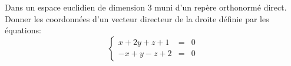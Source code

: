 Dans un espace euclidien de dimension 3 muni d'un rep\`ere orthonorm\'e direct. Donner les coordonn\'ees d'un vecteur directeur de la droite d\'efinie par les \'equations:
\begin{displaymath}
\left\lbrace 
\begin{array}{lcl}
x+2y+z+1 & =&0 \\ 
-x+y-z+2 & =&0
\end{array}
\right. 
\end{displaymath}
\bigskip